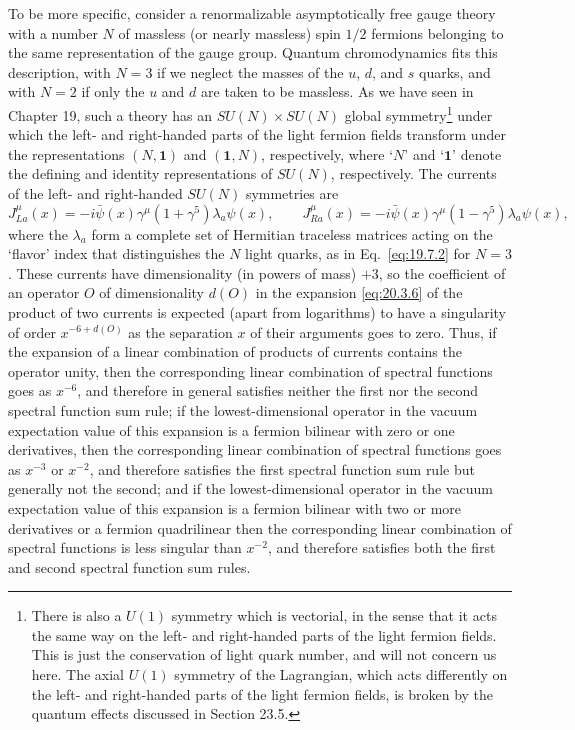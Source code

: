To be more specific, consider a renormalizable asymptotically free gauge theory with a number $N$ of massless (or nearly massless) spin $1/2$ fermions belonging to the same representation of the gauge group. Quantum chromodynamics fits this description, with $N=3$ if we neglect the masses of the $u$, $d$, and $s$ quarks, and with $N=2$ if only the $u$ and $d$ are taken to be massless. As we have seen in Chapter 19, such a theory has an $SU(N)\times SU(N)$ global symmetry\footnote{There is also a $U(1)$ symmetry which is vectorial, in the sense that it acts the same way on the left- and right-handed parts of the light fermion fields. This is just the conservation of light quark number, and will not concern us here. The axial $U(1)$ symmetry of the Lagrangian, which acts differently on the left- and right-handed parts of the light fermion fields, is broken by the quantum effects discussed in Section 23.5.} under which the left- and right-handed parts of the light fermion fields transform under the representations $(N,\mathbf{1})$ and $(\mathbf{1},N)$, respectively, where `$N$' and `$\mathbf{1}$' denote the defining and identity representations of $SU(N)$, respectively. The currents of the left- and right-handed $SU(N)$ symmetries are
\begin{equation}
J_{La}^\mu(x)
=-i\bar\psi(x)\gamma^\mu(1+\gamma^5)\lambda_a\psi(x),
\qquad
J_{Ra}^\mu(x)
=-i\bar\psi(x)\gamma^\mu(1-\gamma^5)\lambda_a\psi(x),
\tag{20.5.11}\label{eq:20.5.11}
\end{equation}
where the $\lambda_a$ form a complete set of Hermitian traceless matrices acting on the `flavor' index that distinguishes the $N$ light quarks, as in Eq.~\eqref{eq:19.7.2} for $N=3$. These currents have dimensionality (in powers of mass) $+3$, so the coefficient of an operator $O$ of dimensionality $d(O)$ in the expansion \eqref{eq:20.3.6} of the product of two currents is expected (apart from logarithms) to have a singularity of order $x^{-6+d(O)}$ as the separation $x$ of their arguments goes to zero. Thus, if the expansion of a linear combination of products of currents contains the operator unity, then the corresponding linear combination of spectral functions goes as $x^{-6}$, and therefore in general satisfies neither the first nor the second spectral function sum rule; if the lowest-dimensional operator in the vacuum expectation value of this expansion is a fermion bilinear with zero or one derivatives, then the corresponding linear combination of spectral functions goes as $x^{-3}$ or $x^{-2}$, and therefore satisfies the first spectral function sum rule but generally not the second; and if the lowest-dimensional operator in the vacuum expectation value of this expansion is a fermion bilinear with two or more derivatives or a fermion quadrilinear then the corresponding linear combination of spectral functions is less singular than $x^{-2}$, and therefore satisfies both the first and second spectral function sum rules.

